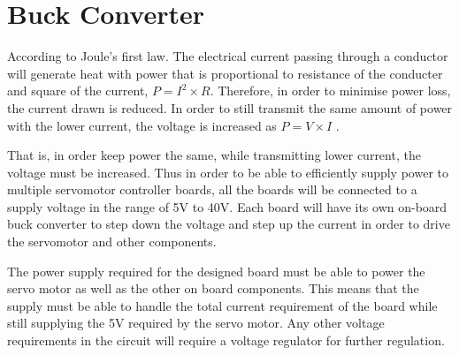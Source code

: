 \newpage
\section{Buck Converter}
\vspace{-5mm}
According to Joule’s first law. The electrical current passing through a conductor  will generate heat with power that is proportional to resistance of the conducter and square of the current, $P=I^2\times R$. Therefore, in order to minimise power loss, the current drawn is reduced. In order to still transmit the same amount of power with the lower current, the voltage is increased as $P=V\times I$ \cite{High_voltage}. 

That is, in order keep power the same, while transmitting lower current, the voltage must be increased. Thus in order to be able to efficiently supply power to multiple servomotor controller boards, all the boards will be connected to a supply voltage in the range of 5V to 40V. Each board will have its own on-board buck converter to step down the voltage and step up the current in order to drive the servomotor and other components.

The power supply required for the designed board must be able to power the servo motor as well as the other on board components. This means that the supply must be able to handle the total current requirement of the board while still supplying the 5V required by the servo motor. Any other voltage requirements in the circuit will require a voltage regulator for further regulation.  

